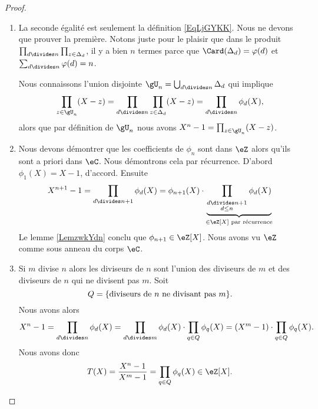 \begin{proof}

    \begin{enumerate}
        \item
            La seconde égalité est seulement la définition \eqref{EqLjGYKK}. Nous ne devons que prouver la première. Notons juste pour le plaisir que dans le produit \( \prod_{d\divides n}\prod_{z\in\Delta_d}\), il y a bien \( n\) termes parce que \( \Card(\Delta_d)=\varphi(d)\) et \( \sum_{d\divides n}\varphi(d)=n\).

            Nous connaissons l'union disjointe \( \gU_n=\bigcup_{d\divides n}\Delta_d\) qui implique
            \begin{equation}
                \prod_{z\in \gU_n}(X-z)=\prod_{d\divides n}\prod_{z\in \Delta_d}(X-z)=\prod_{d\divides n}\phi_d(X),
            \end{equation}
            alors que par définition de \( \gU_n\) nous avons \( X^n-1=\prod_{z\in\gU_n}(X-z)\).

        \item

            Nous devons démontrer que les coefficients de \( \phi_n\) sont dans \( \eZ\) alors qu'ils sont a priori dans \( \eC\). Nous démontrons cela par récurrence. D'abord \( \phi_1(X)=X-1\), d'accord. Ensuite
            \begin{equation}
                X^{n+1}-1=\prod_{d\divides n+1}\phi_d(X)=\phi_{n+1}(X)\cdot\underbrace{\prod_{_{\substack{d\divides n+1\\d\leq n}}}\phi_d(X)}_{\in\eZ[X]\text{ par récurrence}}
            \end{equation}
            Le lemme \ref{LemzwkYdn} conclu que \( \phi_{n+1}\in \eZ[X]\). Nous avons vu \( \eZ\) comme sous anneau du corps \( \eC\).

        \item

            Si \( m\) divise \( n\) alors les diviseurs de \( n\) sont l'union des diviseurs de \( m\) et des diviseurs de \( n\) qui ne divisent pas \( m\). Soit
            \begin{equation}
                Q=\{\text{diviseurs de \( n\) ne divisant pas \( m\)} \}.
            \end{equation}
            Nous avons alors
            \begin{equation}
                X^n-1=\prod_{d\divides n}\phi_d(X)=\prod_{d\divides m}\phi_d(X)\cdot\prod_{q\in Q}\phi_q(X)=(X^m-1)\cdot\prod_{q\in Q}\phi_q(X).
            \end{equation}
            Nous avons donc
            \begin{equation}
                T(X)=\frac{ X^n-1 }{ X^m-1 }=\prod_{q\in Q}\phi_q(X)\in \eZ[X].
            \end{equation}
            

\end{enumerate}
\end{proof}
